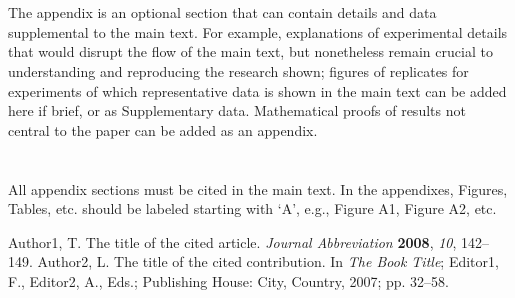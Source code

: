 \documentclass[journal,article,submit,moreauthors,pdftex]{Definitions/mdpi}
\begin{document}

\appendix
\section{}
\unskip
\subsection{}
The appendix is an optional section that can contain details and data supplemental to the main text. For example, explanations of experimental details that would disrupt the flow of the main text, but nonetheless remain crucial to understanding and reproducing the research shown; figures of replicates for experiments of which representative data is shown in the main text can be added here if brief, or as Supplementary data. Mathematical proofs of results not central to the paper can be added as an appendix.

\section{}
All appendix sections must be cited in the main text. In the appendixes, Figures, Tables, etc. should be labeled starting with `A', e.g., Figure A1, Figure A2, etc. 


Author1, T. The title of the cited article. {\em Journal Abbreviation} {\bf 2008}, {\em 10}, 142--149.
Author2, L. The title of the cited contribution. In {\em The Book Title}; Editor1, F., Editor2, A., Eds.; Publishing House: City, Country, 2007; pp. 32--58.
\end{document}
